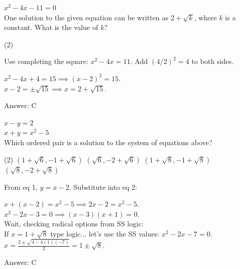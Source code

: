 \documentclass[11pt,paper=a4,answers]{exam}
\begin{document}
\begin{questions}
\pointsinrightmargin
\pointsdroppedatright
\marksnotpoints
{}
\pointformat{\boldmath\themarginpoints}
\bracketedpoints


\question
$x^2 - 4x - 11 = 0$ \\
One solution to the given equation can be written as $2 + \sqrt{k}$, where $k$ is a constant. What is the value of $k$?
\begin{tasks}(2)
       
\end{tasks}

\begin{solution}
Use completing the square: $x^2 - 4x = 11$. Add $(4/2)^2 = 4$ to both sides.
\vspace{5pt}
\begin{center}
$x^2 - 4x + 4 = 15 \implies (x-2)^2 = 15$. \\
$x - 2 = \pm\sqrt{15} \implies x = 2 + \sqrt{15}$.
\end{center}
\vspace{5pt}
Answer: \colorbox{yellow!100}{C}
\end{solution}

\vspace{1cm}

\question
$x - y = 2$ \\
$x + y = x^2 - 5$ \\
Which ordered pair is a solution to the system of equations above?
\begin{tasks}(2)
    \task $(1 + \sqrt{6}, -1 + \sqrt{6})$
    \task $(\sqrt{6}, -2 + \sqrt{6})$
    \task $(1 + \sqrt{8}, -1 + \sqrt{8})$
    \task $(\sqrt{8}, -2 + \sqrt{8})$
\end{tasks}

\begin{solution}
From eq 1, $y = x - 2$. Substitute into eq 2:
\vspace{5pt}
\begin{center}
$x + (x - 2) = x^2 - 5 \implies 2x - 2 = x^2 - 5$. \\
$x^2 - 2x - 3 = 0 \implies (x-3)(x+1) = 0$. \\
Wait, checking radical options from SS logic: \\
If $x = 1 + \sqrt{8}$ type logic... let's use the SS values: $x^2 - 2x - 7 = 0$. \\
$x = \frac{2 \pm \sqrt{4 - 4(1)(-7)}}{2} = 1 \pm \sqrt{8}$.
\end{center}
\vspace{5pt}
Answer: \colorbox{yellow!100}{C}
\end{solution}


\end{questions}
\end{document}

